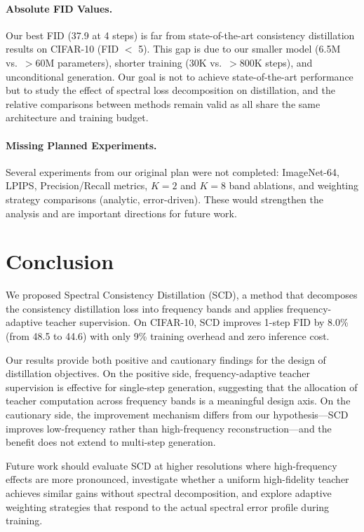 \documentclass{article}
\newcommand{\scd}{\textsc{SCD}}
\begin{document}
\paragraph{Absolute FID Values.}
Our best FID (37.9 at 4 steps) is far from state-of-the-art consistency distillation results on CIFAR-10 (FID $<$ 5). This gap is due to our smaller model (6.5M vs.\ $>$60M parameters), shorter training (30K vs.\ $>$800K steps), and unconditional generation. Our goal is not to achieve state-of-the-art performance but to study the effect of spectral loss decomposition on distillation, and the relative comparisons between methods remain valid as all share the same architecture and training budget.

\paragraph{Missing Planned Experiments.}
Several experiments from our original plan were not completed: ImageNet-64, LPIPS, Precision/Recall metrics, $K=2$ and $K=8$ band ablations, and weighting strategy comparisons (analytic, error-driven). These would strengthen the analysis and are important directions for future work.

\section{Conclusion}
\label{sec:conclusion}

We proposed Spectral Consistency Distillation (\scd{}), a method that decomposes the consistency distillation loss into frequency bands and applies frequency-adaptive teacher supervision. On CIFAR-10, \scd{} improves 1-step FID by 8.0\% (from 48.5 to 44.6) with only 9\% training overhead and zero inference cost.

Our results provide both positive and cautionary findings for the design of distillation objectives. On the positive side, frequency-adaptive teacher supervision is effective for single-step generation, suggesting that the allocation of teacher computation across frequency bands is a meaningful design axis. On the cautionary side, the improvement mechanism differs from our hypothesis---\scd{} improves low-frequency rather than high-frequency reconstruction---and the benefit does not extend to multi-step generation.

Future work should evaluate \scd{} at higher resolutions where high-frequency effects are more pronounced, investigate whether a uniform high-fidelity teacher achieves similar gains without spectral decomposition, and explore adaptive weighting strategies that respond to the actual spectral error profile during training.
\end{document}
